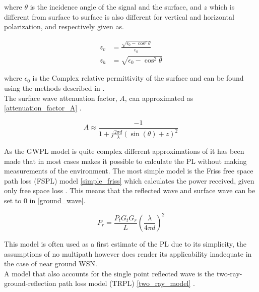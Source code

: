 where $\theta$ is the incidence angle of the signal and the surface, and $z$ which is different from surface to surface is also different for vertical and horizontal polarization, and respectively given as.

\begin{align}
z_v &= \frac{\sqrt{\epsilon_{0}-\cos^{2}\theta}}{\epsilon_{0}} \\
z_h &= \sqrt{\epsilon_{0}-\cos^{2}\theta}
\end{align}

where $\epsilon_{0}$ is the Complex relative permittivity of the surface and can be found using the methods described in \cite{Kim}.\\
The surface wave attenuation factor, $A$, can approximated as \eqref{attenuation_factor_A} \cite{Chong, Bullington}. 


\begin{equation}
A \approx \frac{-1}{1+j\frac{2\pi d}{\lambda}(\sin(\theta)+z)^{2}}
\label{attenuation_factor_A}
\end{equation}


As the GWPL model is quite complex different approximations of it has been made that in most cases makes it possible to calculate the PL without making measurements of the environment. The most simple model is the Friss free space path loss (FSPL) model \eqref{simple_friss} which calculates the power received, given only free space loss \cite{Chong}. This means that the reflected wave and surface wave can be set to 0 in \eqref{ground_wave}. 

\begin{equation}
P_r = \frac{P_t G_t G_r}{L} \left(\frac{\lambda}{4 \pi d}\right)^2
\label{simple_friss}
\end{equation}

This model is often used as a first estimate of the PL due to its simplicity, the assumptions of no multipath however does render its applicability inadequate in the case of near ground WSN. \\



A model that also accounts for the single point reflected wave is the two-ray-ground-reflection path loss model (TRPL) \eqref{two_ray_model} \cite{two_ray}. 

